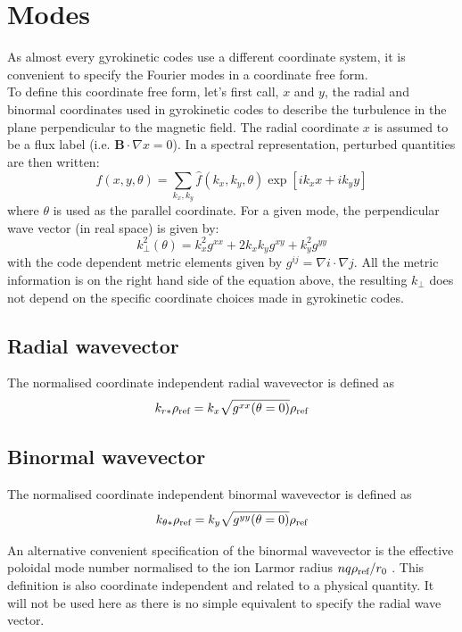 \documentclass[a4paper]{report}
\begin{document}
\section{Modes}
As almost every gyrokinetic codes use a different coordinate system, it is convenient to specify the Fourier modes in a coordinate free form.\\
To define this coordinate free form, let's first call, $x$ and $y$, the radial and binormal coordinates used in gyrokinetic codes to describe the turbulence in the plane perpendicular to the magnetic field. The radial coordinate $x$ is assumed to be a flux label (i.e. $\mathbf{B}\cdot \nabla x =0$).
In a spectral representation, perturbed quantities are then written:
\begin{equation}
 f(x,y,\theta) = \sum_{k_x,k_y} \hat{f}(k_x,k_y,\theta)\exp[ik_x x + ik_y y] 
\end{equation}
where $\theta$ is used as the parallel coordinate.
For a given mode, the perpendicular wave vector (in real space) is given by:
\begin{equation}
 k_\perp^2(\theta) = k_x^2 g^{xx} + 2k_xk_y g^{xy} + k_y^2g^{yy}
\end{equation}
with the code dependent metric elements given by $g^{ij}=\nabla i \cdot \nabla j$. All the metric information is on the right hand side of the equation above, the resulting $k_\perp$ does not depend on the specific coordinate choices made in gyrokinetic codes.

\subsection{Radial wavevector}
The normalised coordinate independent radial wavevector is defined as
\begin{equation}
 k_{r*}\rho_{\textrm{ref}} = k_x \sqrt{g^{xx}(\theta=0)} \rho_{\textrm{ref}}
\end{equation}

\subsection{Binormal wavevector}
The normalised coordinate independent binormal wavevector is defined as
\begin{equation}
 k_{\theta*}\rho_{\textrm{ref}} = k_y \sqrt{g^{yy}(\theta=0)} \rho_{\textrm{ref}}
\end{equation}

An alternative convenient specification of the binormal wavevector is the effective poloidal mode number normalised to the ion Larmor radius  $nq\rho_{\textrm{ref}}/r_0$  \cite{Merlo:PoP2016}. This definition is also coordinate independent and related to a physical quantity. It will not be used here as there is no simple equivalent to specify the radial wave vector.
\end{document}
